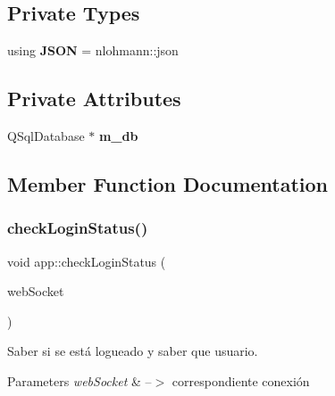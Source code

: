 \subsection*{Private Types}
\begin{DoxyCompactItemize}
\item 
\mbox{\label{classapp_a28638f5d121e9e12247d69575bda5e6d}} 
using {\bfseries J\+S\+ON} = nlohmann\+::json
\end{DoxyCompactItemize}
\subsection*{Private Attributes}
\begin{DoxyCompactItemize}
\item 
\mbox{\label{classapp_a68f450976044452caeb444182c5166ff}} 
Q\+Sql\+Database $\ast$ {\bfseries m\+\_\+db}
\end{DoxyCompactItemize}


\subsection{Member Function Documentation}
\mbox{\label{classapp_a77a1d0cb7a5a4982bcd618a5380e6edf}} 
\subsubsection{\texorpdfstring{check\+Login\+Status()}{checkLoginStatus()}}
{\footnotesize\ttfamily void app\+::check\+Login\+Status (\begin{DoxyParamCaption}\item[{ix\+::\+Web\+Socket $\ast$}]{web\+Socket }\end{DoxyParamCaption})}



Saber si se está logueado y saber que usuario. 


\begin{DoxyParams}{Parameters}
{\em web\+Socket} & --$>$ correspondiente conexión \\
\hline
\end{DoxyParams}
\mbox{\label{classapp_afb7363d3bc58746f8c71425ba6050db1}} 
